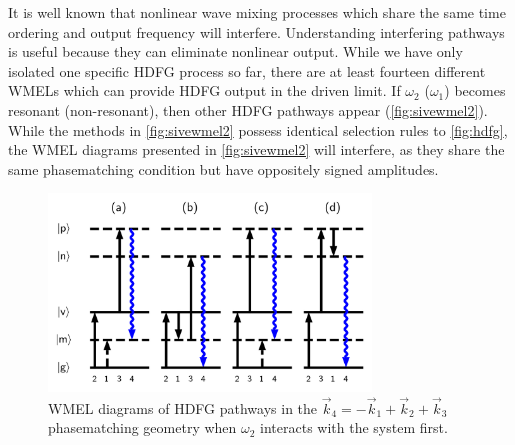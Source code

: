 \documentclass[aip, jcp, reprint, onecolumn]{revtex4-2}
\begin{document}
It is well known that nonlinear wave mixing processes which share the same time ordering and output frequency will interfere. \cite{RN342, RN135}
Understanding interfering pathways is useful because they can eliminate nonlinear output. 
While we have only isolated one specific HDFG process so far, there are at least fourteen different WMELs which can provide HDFG output in the driven limit. \cite{RN352}
If $\omega_2$ ($\omega_1$) becomes resonant (non-resonant), then other HDFG pathways appear (\autoref{fig:sivewmel2}).\cite{McDonnell2024} 
While the methods in \autoref{fig:sivewmel2} possess identical selection rules to \autoref{fig:hdfg}, the WMEL diagrams presented in \autoref{fig:sivewmel2} will interfere, as they share the same phasematching condition but have oppositely signed amplitudes.
\begin{figure}[!htbp]
	\centering
	\includegraphics[width=3.375in]{figures/timeorderedwmel.png}
	\caption{WMEL diagrams of HDFG pathways in the  $\vec{k}_4 = -\vec{k}_1 + \vec{k}_2 + \vec{k}_3$ phasematching geometry when $\omega_2$ interacts with the system first. 
		}
	\label{fig:sivewmel2}
\end{figure}
\end{document}
